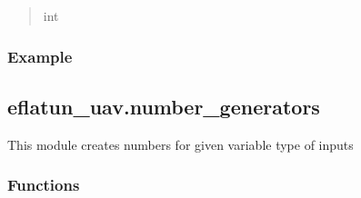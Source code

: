 \documentclass[letterpaper,10pt,english]{sphinxmanual}
\begin{document}
\begin{fulllineitems}
\begin{quote}
\begin{description}
\sphinxAtStartPar
int

\end{description}\end{quote}
\subsubsection*{Example}

\begin{sphinxVerbatim}[commandchars=\\\{\}]
   
\end{sphinxVerbatim}

\end{fulllineitems}


\sphinxstepscope


\subsection{eflatun\_uav.number\_generators}
\label{\detokenize{generated/eflatun_uav.number_generators:module-eflatun_uav.number_generators}}\label{\detokenize{generated/eflatun_uav.number_generators:eflatun-uav-number-generators}}\label{\detokenize{generated/eflatun_uav.number_generators::doc}}
\sphinxAtStartPar
This module creates numbers for given variable type of inputs
\subsubsection*{Functions}
\end{document}
